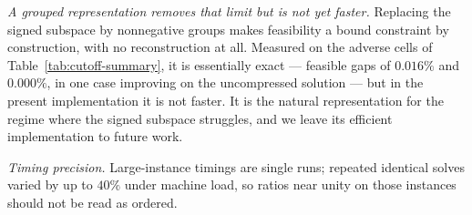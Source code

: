 \documentclass[11pt]{article}
\begin{document}
\emph{A grouped representation removes that limit but is not yet faster.} Replacing the
signed subspace by nonnegative groups makes feasibility a bound constraint by construction,
with no reconstruction at all. Measured on the adverse cells of
Table~\ref{tab:cutoff-summary}, it is essentially exact --- feasible gaps of $0.016\%$ and
$0.000\%$, in one case improving on the uncompressed solution --- but in the present
implementation it is not faster. It is the natural representation for the regime where the
signed subspace struggles, and we leave its efficient implementation to future work.

\emph{Timing precision.} Large-instance timings are single runs; repeated identical solves
varied by up to $40\%$ under machine load, so ratios near unity on those instances should not
be read as ordered.
\end{document}

